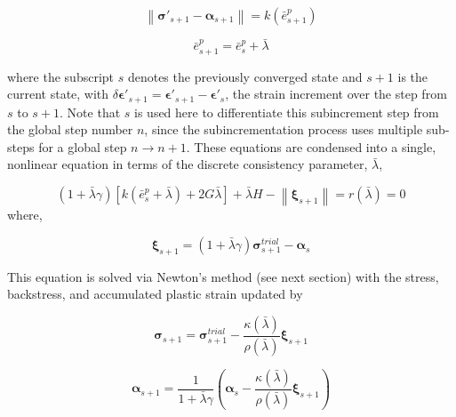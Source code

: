 \documentclass[11pt]{report}
\numberwithin{equation}{section}
\newcommand{\bmf } {\boldsymbol }
\begin{document}
\begin{equation}
\left\| {{\bmf{\sigma }}{'_{s + 1}} - 
{{\bmf{\alpha }}_{s + 1}}} \right\| = k\left( {\bar e_{s + 1}^p} \right)
\end{equation}

\begin{equation}\label{E:define_epbar_update}
\bar e^p_{s + 1} = \bar e_s^p + \bar \lambda 
\end{equation}

\noindent where the subscript $s$ denotes the previously converged state
and $s+1$ is the current state, with $\delta \bmf{\epsilon}'_{s+1} =
\bmf{\epsilon}'_{s+1} - \bmf{\epsilon}'_s$, the strain increment over the
step from $s$ to $s+1$. Note that $s$ is used here to differentiate this 
subincrement step
from the global step number $n$, since the subincrementation process uses
multiple sub-steps for a global step $n \rightarrow n+1$. These equations are
condensed into a single, nonlinear equation in terms of the discrete consistency
parameter, $\bar \lambda$,

%
\begin{equation}\label {E:resid_define}
\left( {1 + \bar \lambda \gamma } \right)\left[ {k\left( {\bar e_s^p + \bar \lambda } 
\right) + 2G\bar \lambda } \right] + \bar \lambda H - \left\| 
{{{\bmf{\xi }}_{s + 1}}} \right\| = r\left( {\bar \lambda } \right) = 0
\end{equation}
%
\noindent where,

%
\begin{equation}
{{\bmf{\xi }}_{s + 1}} = \left( {1 + \bar \lambda \gamma } 
\right){\bmf{\sigma }}_{s + 1}^{trial} - {{\bmf{\alpha }}_s}
\end{equation}
%

\noindent This equation is solved via Newton's method (see next section) with the stress,
backstress, and accumulated plastic strain updated by

\begin{equation}
{{\bmf{\sigma }}_{s + 1}} = {\bmf{\sigma }}_{s + 1}^{trial} 
- \frac{{\kappa \left( {\bar \lambda } \right)}}{{\rho \left( {\bar \lambda } 
\right)}}{{\bmf{\xi }}_{s + 1}}
\end{equation}

\begin{equation}
{{\bmf{\alpha }}_{s + 1}} = \frac{1}{{1 + \bar \lambda 
\gamma }}\left( {{\bmf{\alpha }}_s^{} - \frac{{\kappa \left( 
{\bar \lambda } \right)}}{{\rho \left( {\bar \lambda } \right)}}{{\bmf{\xi }}_{s + 1}}} \right)
\end{equation}
\end{document}
